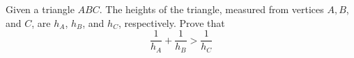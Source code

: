 Given a triangle $ABC$. The heights of the triangle, measured from vertices $A, B$, and $C$, are $h_A$, $h_B$, and $h_C$, respectively. Prove that \[\dfrac{1}{h_A}+\dfrac{1}{h_B} > \dfrac{1}{h_C}\]
